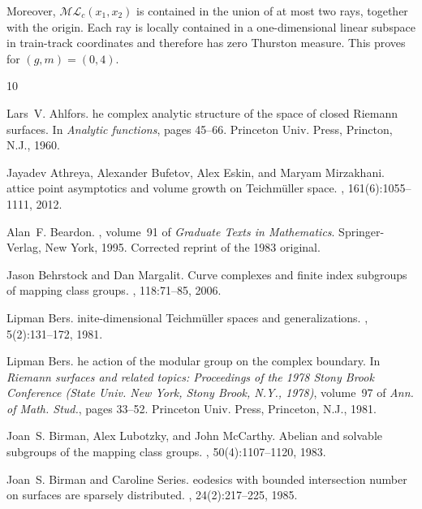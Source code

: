 \documentclass[dvipdfmx]{amsart}
\theoremstyle{remark}
\newcommand{\ml}{\mathcal{ML}}
\begin{document}
Moreover, $\ml_c(x_1,x_2)$ is contained in the
union of at most two rays, together with the
origin.
Each ray is locally contained in a one-dimensional
linear subspace in train-track coordinates and
therefore has zero Thurston measure.
This proves  for $(g,m)=(0,4)$.
\def\cprime{$'$} \def\cprime{$'$}
\begin{thebibliography}{10}

Lars~V. Ahlfors.
he complex analytic structure of the space of closed {R}iemann surfaces.
\newblock In {\em Analytic functions}, pages 45--66. Princeton Univ. Press, Princton, N.J., 1960.

Jayadev Athreya, Alexander Bufetov, Alex Eskin, and Maryam Mirzakhani.
attice point asymptotics and volume growth on {T}eichm{\"u}ller space.
, 161(6):1055--1111, 2012.

Alan~F. Beardon.
, volume~91 of {\em Graduate Texts in Mathematics}.
\newblock Springer-Verlag, New York, 1995.
\newblock Corrected reprint of the 1983 original.

Jason Behrstock and Dan Margalit.
\newblock Curve complexes and finite index subgroups of mapping class groups.
, 118:71--85, 2006.

Lipman Bers.
inite-dimensional {T}eichm{\"u}ller spaces and generalizations.
, 5(2):131--172, 1981.

Lipman Bers.
he action of the modular group on the complex boundary.
\newblock In {\em Riemann surfaces and related topics: Proceedings of the 1978 Stony Brook Conference (State Univ. New York, Stony Brook, N.Y., 1978)}, volume~97 of {\em Ann. of Math. Stud.}, pages 33--52. Princeton Univ. Press, Princeton, N.J., 1981.

Joan~S. Birman, Alex Lubotzky, and John McCarthy.
\newblock Abelian and solvable subgroups of the mapping class groups.
, 50(4):1107--1120, 1983.

Joan~S. Birman and Caroline Series.
eodesics with bounded intersection number on surfaces are sparsely distributed.
, 24(2):217--225, 1985.


\end{thebibliography}
\end{document}
